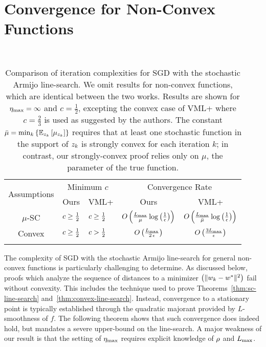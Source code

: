\section{Convergence for Non-Convex Functions}~\label{sec:ls-nc}

\begin{table}[t]
    \centering
    \begin{tabular}{c l l c c }\toprule
        \multirow{2}{*}{Assumptions} & \multicolumn{2}{c}{Minimum \( c \)} & \multicolumn{2}{c}{Convergence Rate}\\%
        \cmidrule(lr){2-3} \cmidrule(lr){4-5}
                 & \multicolumn{1}{c}{Ours} & \multicolumn{1}{c}{VML+}%
                 & \multicolumn{1}{c}{Ours} & \multicolumn{1}{c}{VML+}\\ \midrule
    \( \mu \)-SC & \( c \geq \frac 1 2 \)%
                 & \( c \geq \frac 1 2 \)%
                 & \( O\left(\frac{L_{\text{max}}}{\mu} \log\left(\frac{1}{\epsilon}\right)\right) \)%
                 & \( O\left(\frac{L_{\text{max}}}{\bar \mu} \log\left(\frac{1}{\epsilon}\right)\right) \) \\ \addlinespace
    Convex       & \( c \geq \frac 1 2 \)%
                 & \( c > \frac 1 2 \)%
                 & \( O\left(\frac{L_{\text{max}}}{2 \, \epsilon}\right) \)%
                 & \( O\left(\frac{3 L_{\text{max}}}{\epsilon}\right) \)\\ \addlinespace \bottomrule 
        \end{tabular}
        \caption[Comparison of iteration complexities for stochastic gradient descent with the stochastic Armijo line-search.]%
        {Comparison of iteration complexities for \ac{SGD} with the stochastic Armijo line-search.
         We omit results for non-convex functions, which are identical between the two works.
         Results are shown for \( \eta_{\text{max}} = \infty \) and \( c = \frac{1}{2} \), excepting the convex case of VML+ \citep{vaswani2019painless} where \( c = \frac{2}{3} \) is used as suggested by the authors.
         The constant \( \bar \mu = \min_k \left\{\mathbb{E}_{z_{k}} \left[\mu_{z_{k}}\right] \right\} \) requires that at least one stochastic function in the support of \( z_{k} \) is strongly convex for each iteration \( k \);
         in contrast, our strongly-convex proof relies only on \( \mu \), the parameter of the true function.  }%
    \label{table:ls-comparison}
\end{table}

The complexity of \ac{SGD} with the stochastic Armijo line-search for general non-convex functions is particularly challenging to determine.
As discussed below, proofs which analyze the sequence of distances to a minimizer \( \left(\|w_k - w^*\|^2\right) \) fail without convexity.
This includes the technique used to prove Theorems~\ref{thm:sc-line-search} and~\ref{thm:convex-line-search}.
Instead, convergence to a stationary point is typically established through the quadratic majorant provided by \( L \)-smoothness of \( f \).
The following theorem shows that such convergence does indeed hold, but mandates a severe upper-bound on the line-search.
A major weakness of our result is that the setting of \( \eta_{\text{max}} \) requires explicit knowledge of \( \rho \) and \( L_{\text{max}} \). 

